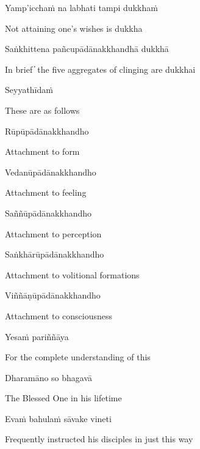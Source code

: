 Yamp'icchaṁ na labhati tampi dukkhaṁ

\begin{cprenglish}
Not attaining one’s wishes is dukkha
\end{cprenglish}

Saṅkhittena pañcupādānakkhandhā dukkhā

\begin{cprenglish}
In brief  ̓  the five aggregates of clinging are dukkhai
\end{cprenglish}

Seyyathīdaṁ

\begin{cprenglish}
These are as follows
\end{cprenglish}

Rūpūpādānakkhandho

\begin{cprenglish}
Attachment to form
\end{cprenglish}

Vedanūpādānakkhandho

\begin{cprenglish}
Attachment to feeling
\end{cprenglish}

Saññūpādānakkhandho

\begin{cprenglish}
Attachment to perception
\end{cprenglish}

Saṅkhārūpādānakkhandho

\begin{cprenglish}
Attachment to volitional formations
\end{cprenglish}

Viññāṇūpādānakkhandho

\begin{cprenglish}
Attachment to consciousness
\end{cprenglish}

Yesaṁ pariññāya

\begin{cprenglish}
For the complete understanding of this
\end{cprenglish}

Dharamāno so bhagavā

\begin{cprenglish}
The Blessed One in his lifetime
\end{cprenglish}

Evaṁ bahulaṁ sāvake vineti

\begin{cprenglish}
Frequently instructed his disciples in just this way
\end{cprenglish}


